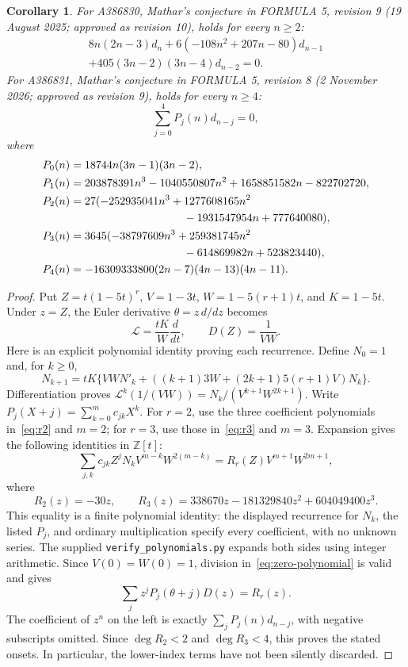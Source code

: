 \documentclass[11pt]{article}
\newtheorem{corollary}[theorem]{Corollary}
\begin{document}
\begin{corollary}\label{cor:recurrences}
For A386830, Mathar's conjecture in FORMULA 5, revision 9
(19 August 2025; approved as revision 10), holds for every $n\geq2$:
\begin{multline}\label{eq:r2}
8n(2n-3)d_n+6(-108n^2+207n-80)d_{n-1}\\
 +405(3n-2)(3n-4)d_{n-2}=0.
\end{multline}
For A386831, Mathar's conjecture in FORMULA 5, revision 8
(2 November 2026; approved as revision 9), holds for every $n\geq4$:
\begin{equation}\label{eq:r3}
 \sum_{j=0}^4 P_j(n)d_{n-j}=0,
\end{equation}
where
\begin{align*}
P_0(n)&=18744n(3n-1)(3n-2),\\
P_1(n)&=203878391n^3-1040550807n^2+1658851582n-822702720,\\
P_2(n)&=27(-252935041n^3+1277608165n^2\\
 &\hspace{36mm}-1931547954n+777640080),\\
P_3(n)&=3645(-38797609n^3+259381745n^2\\
 &\hspace{36mm}-614869982n+523823440),\\
P_4(n)&=-16309333800(2n-7)(4n-13)(4n-11).
\end{align*}
\end{corollary}
\begin{proof}
Put $Z=t(1-5t)^r$, $V=1-3t$, $W=1-5(r+1)t$, and $K=1-5t$.
Under $z=Z$, the Euler derivative $\theta=z\,d/dz$ becomes
\[
 \mathcal L=\frac{tK}{W}\frac{d}{dt},\qquad D(Z)=\frac1{VW}.
\]
Here is an explicit polynomial identity proving each recurrence.
Define $N_0=1$ and, for $k\geq0$,
\begin{equation}\label{eq:certificate}
N_{k+1}=tK\{VW N'_k+((k+1)3W+(2k+1)5(r+1)V)N_k\}.
\end{equation}
Differentiation proves
$\mathcal L^k(1/(VW))=N_k/(V^{k+1}W^{2k+1})$.
Write $P_j(X+j)=\sum_{k=0}^m c_{jk}X^k$. For $r=2$, use the
three coefficient polynomials in~\eqref{eq:r2} and $m=2$; for $r=3$,
use those in~\eqref{eq:r3} and $m=3$. Expansion gives the following
identities in $\mathbb Z[t]$:
\begin{equation}\label{eq:zero-polynomial}
\sum_{j,k}c_{jk}Z^jN_kV^{m-k}W^{2(m-k)}
 =R_r(Z)V^{m+1}W^{2m+1},
\end{equation}
where
\[
 R_2(z)=-30z,\qquad
 R_3(z)=338670z-181329840z^2+604049400z^3.
\]
This equality is a finite polynomial identity: the displayed recurrence
for $N_k$, the listed $P_j$, and ordinary multiplication specify every
coefficient, with no unknown series. The supplied
\texttt{verify\_polynomials.py} expands both sides using integer arithmetic.
Since $V(0)=W(0)=1$, division in~\eqref{eq:zero-polynomial} is valid and gives
\[
 \sum_j z^jP_j(\theta+j)D(z)=R_r(z).
\]
The coefficient of $z^n$ on the left is exactly
$\sum_jP_j(n)d_{n-j}$, with negative subscripts omitted. Since
$\deg R_2<2$ and $\deg R_3<4$, this proves the stated onsets.
In particular, the lower-index terms have not been silently discarded.
\end{proof}
\end{document}
